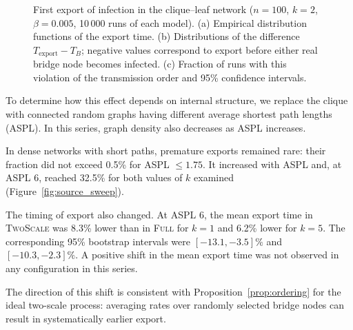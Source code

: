 \documentclass[a4paper,fleqn]{cas-sc}
\newcommand{\Full}{\textup{\textsc{Full}}}
\newcommand{\TS}{\textup{\textsc{TwoScale}}}
\begin{document}
\begin{figure}[tbp]
\caption{%
First export of infection in the clique--leaf network ($n=100$, $k=2$, $\beta=0.005$, 10\,000 runs of each model).
(a) Empirical distribution functions of the export time.
(b) Distributions of the difference $T_{\mathrm{export}}-T_B$; negative values correspond to export before either real bridge node becomes infected.
(c) Fraction of runs with this violation of the transmission order and 95\% confidence intervals.
}
\label{fig:clique_leaf}
\end{figure}

To determine how this effect depends on internal structure, we replace the clique with connected random graphs having different average shortest path lengths (ASPL). In this series, graph density also decreases as ASPL increases.

In dense networks with short paths, premature exports remained rare: their fraction did not exceed 0.5\% for ASPL $\leq 1.75$. It increased with ASPL and, at ASPL 6, reached 32.5\% for both values of $k$ examined (Figure~\ref{fig:source_sweep}).

The timing of export also changed. At ASPL 6, the mean export time in \TS{} was 8.3\% lower than in \Full{} for $k=1$ and 6.2\% lower for $k=5$. The corresponding 95\% bootstrap intervals were $[-13.1,-3.5]\%$ and $[-10.3,-2.3]\%$. A positive shift in the mean export time was not observed in any configuration in this series.

The direction of this shift is consistent with Proposition~\ref{prop:ordering} for the ideal two-scale process: averaging rates over randomly selected bridge nodes can result in systematically earlier export.
\end{document}
